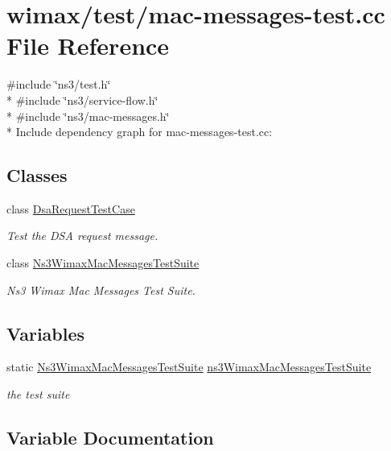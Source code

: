 \hypertarget{mac-messages-test_8cc}{}\section{wimax/test/mac-\/messages-\/test.cc File Reference}
\label{mac-messages-test_8cc}
{\ttfamily \#include \char`\"{}ns3/test.\+h\char`\"{}}\\*
{\ttfamily \#include \char`\"{}ns3/service-\/flow.\+h\char`\"{}}\\*
{\ttfamily \#include \char`\"{}ns3/mac-\/messages.\+h\char`\"{}}\\*
Include dependency graph for mac-\/messages-\/test.cc\+:
\subsection*{Classes}
\begin{DoxyCompactItemize}
\item 
class \hyperlink{classDsaRequestTestCase}{Dsa\+Request\+Test\+Case}
\begin{DoxyCompactList}\small\item\em Test the D\+SA request message. \end{DoxyCompactList}\item 
class \hyperlink{classNs3WimaxMacMessagesTestSuite}{Ns3\+Wimax\+Mac\+Messages\+Test\+Suite}
\begin{DoxyCompactList}\small\item\em Ns3 Wimax Mac Messages Test Suite. \end{DoxyCompactList}\end{DoxyCompactItemize}
\subsection*{Variables}
\begin{DoxyCompactItemize}
\item 
static \hyperlink{classNs3WimaxMacMessagesTestSuite}{Ns3\+Wimax\+Mac\+Messages\+Test\+Suite} \hyperlink{mac-messages-test_8cc_a7734f17cc2202c4a44e7420b38d6aabc}{ns3\+Wimax\+Mac\+Messages\+Test\+Suite}
\begin{DoxyCompactList}\small\item\em the test suite \end{DoxyCompactList}\end{DoxyCompactItemize}


\subsection{Variable Documentation}
